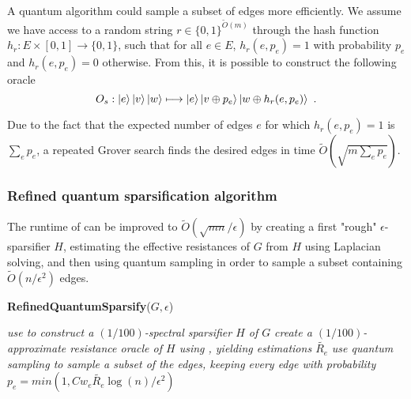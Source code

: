 A quantum algorithm could sample a subset of edges more efficiently. 
We assume we have access to a random string $r \in \{0,1\}^{\tilde{O}(m)}$  through the hash function $h_r: E\times [0,1] \rightarrow \{0,1\}$,
such that for all $e\in E$, $h_r(e,p_e) = 1$ with probability $p_e$ and $h_r(e,p_e)=0$ otherwise.
From this, it is possible to construct the following oracle
\begin{equation*}
O_s : \ket{e} \ket{v} \ket{w} \longmapsto \ket{e} \ket{v \oplus p_e} \ket{w \oplus h_r(e,p_e)} \ . 
\end{equation*}

Due to the fact that the expected number of edges $e$ for which $h_r(e,p_e)=1$ is $\sum_e p_e$, a repeated Grover search 
finds the desired edges in time $\tilde{O}(\sqrt{m \sum_e p_e})$. 


\subsubsection{Refined quantum sparsification algorithm}

The runtime of  can be improved to
$\tilde{O}(\sqrt{mn}/\epsilon)$ by creating a first "rough"
$\epsilon$-sparsifier $H$, estimating the effective resistances of $G$ from $H$
using Laplacian solving, and then using quantum sampling in order to sample a subset
containing $\tilde{O}(n/\epsilon^2)$ edges.


\begin{algorithm}
    \caption{\textbf{RefinedQuantumSparsify}($G,\epsilon$)}\label{alg:quantum-sparsify2}
    \begin{algorithmic}[1]
    
    \State \textit{use
     to construct a $(1/100)$-spectral sparsifier $H$ of $G$} 
    \State \textit{create a $(1/100)$-approximate resistance oracle of
    $H$ using , yielding estimations
    $\tilde{R_e}$} 
    \State \textit{use quantum sampling to sample a subset of the
    edges, keeping every edge with probability $p_e =
    min(1,Cw_e\tilde{R_e}\log(n)/\epsilon^2)$}
    \end{algorithmic}
\end{algorithm}

